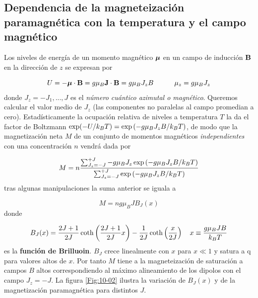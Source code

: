 \subsection[Dependencia de la magnetización respecto $\vec{\Bn}$ y $T$]{Dependencia de la magneteización paramagnética con la temperatura y el campo magnético}

Los niveles de energía de un momento magnético $\boldsymbol{\mu}$ en un campo de inducción $\mathbf{B}$ en la dirección de $z$ se expresan por 

\begin{equation}
	U = - \boldsymbol{\mu} \cdot \mathbf{B} = g \mu_B \mathbf{J} \cdot \mathbf{B} = g \mu_B J_z B \quad \quad \quad \mu_z = g \mu_B J_z
\end{equation}
donde $J_z = - J_1,...,J$ es el \textit{número cuántico azimutal o magnético}. Queremos calcular el valor medio de $J_z$ (las componentes no paralelas al campo promedian a cero). Estadísticamente la ocupación relativa de niveles a temperatura $T$ la da el factor de Boltzmann $\exp (-U/k_B T)=\exp \left( -g\mu_B J_z B / k_B T \right)$, de modo que la magnetización neta $M$ de un conjunto de momentos magnéticos \textit{independientes} con una concentración $n$ vendrá dada por 

\begin{equation}
	M = n \frac{\sum_{J_z=-J}^{+J} - g\mu_B J_z \exp \left( - g\mu_B J_z B / k_BT \right)}{\sum_{J_z=-J}^{+J} \exp \left( -g\mu_B J_z B / k_B T \right)} \label{Ec:10-03-07}
\end{equation}
tras algunas manipulaciones la suma anterior se iguala a 

\begin{equation}
	M = n g \mu_B J B_J (x)
\end{equation}
donde 

\begin{equation}
	B_J (x) = \frac{2J+1}{2J} \coth \left( \frac{2J+1}{2J}x \right) - \frac{1}{2J} \coth \left( \frac{x}{2J} \right) \quad x \equiv \frac{g\mu_B J B }{k_B T}
\end{equation}
es la \textbf{función de Brilluoin}. $B_J$ crece linealmente con $x$ para $x\ll 1$ y satura a q para valores altos de $x$. Por tanto $M$ tiene a la magneteización de saturación a campos $B$ altos correspondiendo al máximo alineamiento de los dipolos con el campo $J_z = -J$. La figura \ref{Fig:10-02} ilustra la variación de $B_J(x)$ y de la magnetización paramagnética para distintos $J$.

